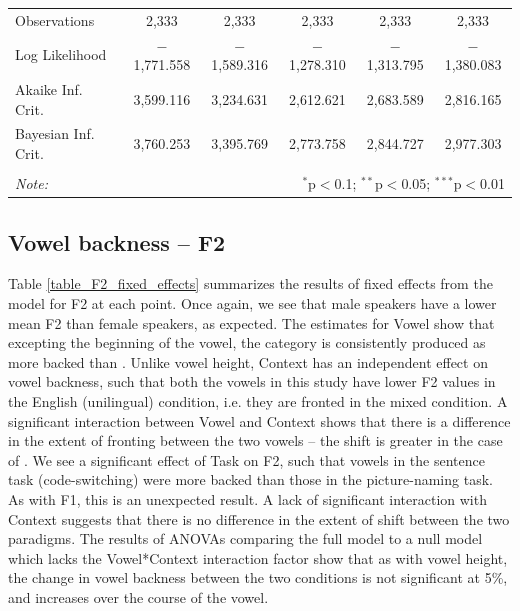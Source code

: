 \documentclass[charis,linguex]{glossa}
\newcommand{\nt}[1]{\textipa{[#1]}} %
\begin{document}
\begin{table}[htbp]
\begin{tabular}{@{\extracolsep{5pt}}lccccc}
		Observations & 2,333 & 2,333 & 2,333 & 2,333 & 2,333 \\ 
		Log Likelihood & $-$1,771.558 & $-$1,589.316 & $-$1,278.310 & $-$1,313.795 & $-$1,380.083 \\ 
		Akaike Inf. Crit. & 3,599.116 & 3,234.631 & 2,612.621 & 2,683.589 & 2,816.165 \\ 
		Bayesian Inf. Crit. & 3,760.253 & 3,395.769 & 2,773.758 & 2,844.727 & 2,977.303 \\ 
		\hline 
		\hline \\[-1.8ex] 
		\textit{Note:}  & \multicolumn{5}{r}{$^{*}$p$<$0.1; $^{**}$p$<$0.05; $^{***}$p$<$0.01} \\ 
	\end{tabular} 
\end{table} 


\subsection{Vowel backness -- F2}

Table \ref{table_F2_fixed_effects} summarizes the results of fixed effects from the model for F2 at each point. Once again, we see that male speakers have a lower mean F2 than female speakers, as expected. The estimates for Vowel show that excepting the beginning of the vowel, the category \nt{2} is consistently produced as more backed than \nt{\ae}. Unlike vowel height, Context has an independent effect on vowel backness, such that both the vowels in this study have lower F2 values in the English (unilingual) condition, i.e. they are fronted in the mixed condition. A significant interaction between Vowel and Context shows that there is a difference in the extent of fronting between the two vowels -- the shift is greater in the case of \nt{\ae}. We see a significant effect of Task on F2, such that vowels in the sentence task (code-switching) were more backed than those in the picture-naming task. As with F1, this is an unexpected result. A lack of significant interaction with Context suggests that there is no difference in the extent of shift between the two paradigms. The results of ANOVAs comparing the full model to a null model which lacks the Vowel*Context interaction factor show that as with vowel height, the change in vowel backness between the two conditions is not significant at 5\%, and increases over the course of the vowel.
\end{document}
